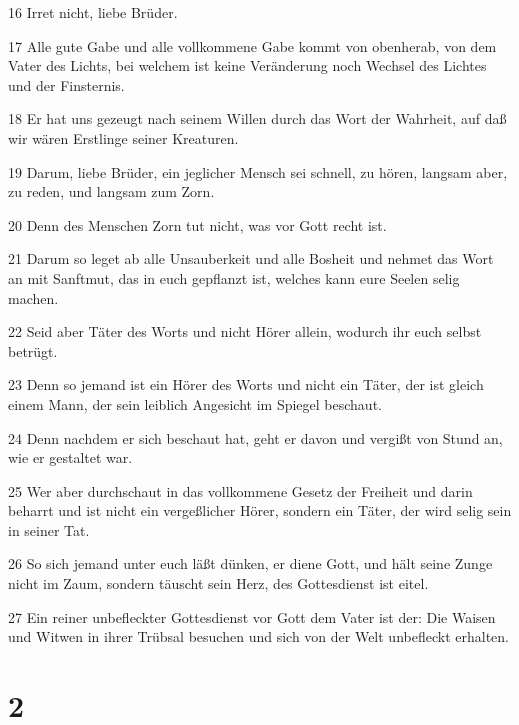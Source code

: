 \par 16 Irret nicht, liebe Brüder.
\par 17 Alle gute Gabe und alle vollkommene Gabe kommt von obenherab, von dem Vater des Lichts, bei welchem ist keine Veränderung noch Wechsel des Lichtes und der Finsternis.
\par 18 Er hat uns gezeugt nach seinem Willen durch das Wort der Wahrheit, auf daß wir wären Erstlinge seiner Kreaturen.
\par 19 Darum, liebe Brüder, ein jeglicher Mensch sei schnell, zu hören, langsam aber, zu reden, und langsam zum Zorn.
\par 20 Denn des Menschen Zorn tut nicht, was vor Gott recht ist.
\par 21 Darum so leget ab alle Unsauberkeit und alle Bosheit und nehmet das Wort an mit Sanftmut, das in euch gepflanzt ist, welches kann eure Seelen selig machen.
\par 22 Seid aber Täter des Worts und nicht Hörer allein, wodurch ihr euch selbst betrügt.
\par 23 Denn so jemand ist ein Hörer des Worts und nicht ein Täter, der ist gleich einem Mann, der sein leiblich Angesicht im Spiegel beschaut.
\par 24 Denn nachdem er sich beschaut hat, geht er davon und vergißt von Stund an, wie er gestaltet war.
\par 25 Wer aber durchschaut in das vollkommene Gesetz der Freiheit und darin beharrt und ist nicht ein vergeßlicher Hörer, sondern ein Täter, der wird selig sein in seiner Tat.
\par 26 So sich jemand unter euch läßt dünken, er diene Gott, und hält seine Zunge nicht im Zaum, sondern täuscht sein Herz, des Gottesdienst ist eitel.
\par 27 Ein reiner unbefleckter Gottesdienst vor Gott dem Vater ist der: Die Waisen und Witwen in ihrer Trübsal besuchen und sich von der Welt unbefleckt erhalten.

\chapter{2}

